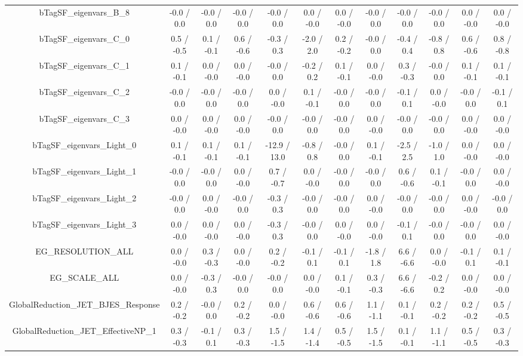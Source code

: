 \begin{table}[htbp]
\begin{center}
\begin{tabular}{|c|c|c|c|c|c|c|c|c|c|c|c|}
  bTagSF_eigenvars_B_8 & -0.0 / 0.0 & -0.0 / 0.0 & -0.0 / 0.0 & -0.0 / 0.0 & 0.0 / -0.0 & 0.0 / -0.0 & -0.0 / 0.0 & -0.0 / 0.0 & -0.0 / 0.0 & 0.0 / -0.0 & 0.0 / -0.0 \\ 
  bTagSF_eigenvars_C_0 & 0.5 / -0.5 & 0.1 / -0.1 & 0.6 / -0.6 & -0.3 / 0.3 & -2.0 / 2.0 & 0.2 / -0.2 & -0.0 / 0.0 & -0.4 / 0.4 & -0.8 / 0.8 & 0.6 / -0.6 & 0.8 / -0.8 \\ 
  bTagSF_eigenvars_C_1 & 0.1 / -0.1 & 0.0 / -0.0 & 0.0 / -0.0 & -0.0 / 0.0 & -0.2 / 0.2 & 0.1 / -0.1 & 0.0 / -0.0 & 0.3 / -0.3 & -0.0 / 0.0 & 0.1 / -0.1 & 0.1 / -0.1 \\ 
  bTagSF_eigenvars_C_2 & -0.0 / 0.0 & -0.0 / 0.0 & -0.0 / 0.0 & 0.0 / -0.0 & 0.1 / -0.1 & -0.0 / 0.0 & -0.0 / 0.0 & -0.1 / 0.1 & 0.0 / -0.0 & -0.0 / 0.0 & -0.1 / 0.1 \\ 
  bTagSF_eigenvars_C_3 & 0.0 / -0.0 & 0.0 / -0.0 & 0.0 / -0.0 & -0.0 / 0.0 & -0.0 / 0.0 & -0.0 / 0.0 & 0.0 / -0.0 & -0.0 / 0.0 & -0.0 / 0.0 & 0.0 / -0.0 & 0.0 / -0.0 \\ 
  bTagSF_eigenvars_Light_0 & 0.1 / -0.1 & 0.1 / -0.1 & 0.1 / -0.1 & -12.9 / 13.0 & -0.8 / 0.8 & -0.0 / 0.0 & 0.1 / -0.1 & -2.5 / 2.5 & -1.0 / 1.0 & 0.0 / -0.0 & 0.0 / -0.0 \\ 
  bTagSF_eigenvars_Light_1 & -0.0 / 0.0 & -0.0 / 0.0 & 0.0 / -0.0 & 0.7 / -0.7 & 0.0 / -0.0 & -0.0 / 0.0 & -0.0 / 0.0 & 0.6 / -0.6 & 0.1 / -0.1 & -0.0 / 0.0 & 0.0 / -0.0 \\ 
  bTagSF_eigenvars_Light_2 & -0.0 / 0.0 & 0.0 / -0.0 & -0.0 / 0.0 & -0.3 / 0.3 & -0.0 / 0.0 & -0.0 / 0.0 & 0.0 / -0.0 & -0.0 / 0.0 & -0.0 / 0.0 & 0.0 / -0.0 & -0.0 / 0.0 \\ 
  bTagSF_eigenvars_Light_3 & 0.0 / -0.0 & 0.0 / -0.0 & 0.0 / -0.0 & -0.3 / 0.3 & -0.0 / 0.0 & 0.0 / -0.0 & 0.0 / -0.0 & -0.1 / 0.1 & -0.0 / 0.0 & -0.0 / 0.0 & 0.0 / -0.0 \\ 
  EG_RESOLUTION_ALL & 0.0 / -0.0 & 0.3 / -0.3 & 0.0 / -0.0 & 0.2 / -0.2 & -0.1 / 0.1 & -0.1 / 0.1 & -1.8 / 1.8 & 6.6 / -6.6 & 0.0 / -0.0 & -0.1 / 0.1 & 0.1 / -0.1 \\ 
  EG_SCALE_ALL & 0.0 / -0.0 & -0.3 / 0.3 & -0.0 / 0.0 & -0.0 / 0.0 & 0.0 / -0.0 & 0.1 / -0.1 & 0.3 / -0.3 & 6.6 / -6.6 & -0.2 / 0.2 & 0.0 / -0.0 & 0.0 / -0.0 \\ 
  GlobalReduction_JET_BJES_Response & 0.2 / -0.2 & -0.0 / 0.0 & 0.2 / -0.2 & 0.0 / -0.0 & 0.6 / -0.6 & 0.6 / -0.6 & 1.1 / -1.1 & 0.1 / -0.1 & 0.2 / -0.2 & 0.2 / -0.2 & 0.5 / -0.5 \\ 
  GlobalReduction_JET_EffectiveNP_1 & 0.3 / -0.3 & -0.1 / 0.1 & 0.3 / -0.3 & 1.5 / -1.5 & 1.4 / -1.4 & 0.5 / -0.5 & 1.5 / -1.5 & 0.1 / -0.1 & 1.1 / -1.1 & 0.5 / -0.5 & 0.3 / -0.3 \\ 

\end{tabular}
\end{center}
\end{table}
